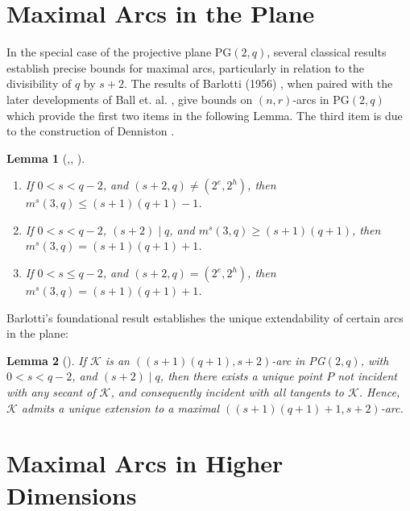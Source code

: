 \documentclass[letterpaper, 12pt]{article}
\newtheorem{lemma}{Lemma}
\newcommand{\K}{\mathcal{K}}
\begin{document}
\section*{Maximal Arcs in the Plane}

In the special case of the projective plane PG\((2, q)\), several classical results establish precise bounds for maximal arcs, particularly in relation to the divisibility of \( q \) by \( s + 2 \). The results of Barlotti (1956) \cite{MR0083141}, when paired with the later developments of Ball et. al. \cite{MR1466573}, give bounds on $(n,r)$-arcs in PG$(2,q)$ which provide the first two items in the following Lemma. The third item is due to the construction of Denniston \cite{MR0239991}.

 
\begin{lemma}[\cite{MR0083141},\cite{MR1466573}, \cite{MR0239991}]  \label{lem: Barlotti 3d}  \leavevmode
	\begin{enumerate}
		\item If \( 0 < s < q - 2 \), and \( (s+2,q) \ne (2^e,2^h) \), then \( m^s(3,q) \le (s+1)(q+1)-1 \).
		\item If \( 0 < s < q - 2 \), \( (s+2) \mid q \), and \( m^s(3,q) \ge (s+1)(q+1) \), then \( m^s(3,q) = (s+1)(q+1)+1 \).
		\item If \( 0 < s \le q - 2 \), and \( (s+2,q) = (2^e,2^h) \), then \( m^s(3,q) = (s+1)(q+1)+1 \).
	\end{enumerate}
\end{lemma}

Barlotti's foundational result establishes the unique extendability of certain arcs in the plane:

\begin{lemma}[\cite{MR0083141}]\label{lem Barlotti Extension k = 3}
	If \( \K \) is an \(((s+1)(q+1), s+2)\)-arc in PG\((2, q)\), with \( 0 < s < q - 2 \), and \( (s+2) \mid q \), then there exists a unique point \( P \) not incident with any secant of \( \K \), and consequently incident with all tangents to \( \K \). Hence, \( \K \) admits a unique extension to a maximal \(((s+1)(q+1)+1, s+2)\)-arc.
\end{lemma}


\section*{Maximal Arcs in Higher Dimensions}
\end{document}
